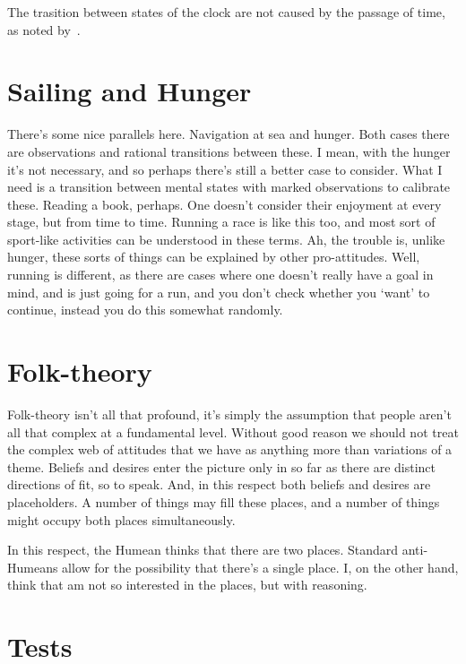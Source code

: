 \documentclass[10pt]{article}
\begin{document}
The trasition between states of the clock are not caused by the passage of time, as noted by~\textcite{Smith:1988aa}.

\section{Sailing and Hunger}
\label{sec:sailing-hunger}

There's some nice parallels here.
Navigation at sea and hunger.
Both cases there are observations and rational transitions between these.
I mean, with the hunger it's not necessary, and so perhaps there's still a better case to consider.
What I need is a transition between mental states with marked observations to calibrate these.
Reading a book, perhaps.
One doesn't consider their enjoyment at every stage, but from time to time.
Running a race is like this too, and most sort of sport-like activities can be understood in these terms.
Ah, the trouble is, unlike hunger, these sorts of things can be explained by other pro-attitudes.
Well, running is different, as there are cases where one doesn't really have a goal in mind, and is just going for a run, and you don't check whether you `want' to continue, instead you do this somewhat randomly.



\section{Folk-theory}
\label{sec:folk-theory}

Folk-theory isn't all that profound, it's simply the assumption that people aren't all that complex at a fundamental level.
Without good reason we should not treat the complex web of attitudes that we have as anything more than variations of a theme.
Beliefs and desires enter the picture only in so far as there are distinct directions of fit, so to speak.
And, in this respect both beliefs and desires are placeholders.
A number of things may fill these places, and a number of things might occupy both places simultaneously.

In this respect, the Humean thinks that there are two places.
Standard anti-Humeans allow for the possibility that there's a single place.
I, on the other hand, think that am not so interested in the places, but with reasoning.


\section{Tests}
\label{sec:tests}
\end{document}
